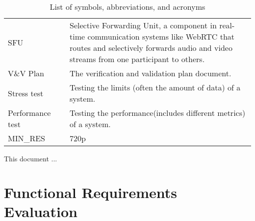 \documentclass[12pt, titlepage]{article}
\begin{document}
\begin{table}[H]
\begin{tabular}{L{0.25\linewidth}L{0.8\linewidth}}
    SFU                        & Selective Forwarding Unit, a component in real-time communication systems like WebRTC that routes and selectively forwards audio and video streams from one participant to others. \\
    V\&V Plan                  & The verification and validation plan document.                                                                                                                                     \\
    Stress test                & Testing the limits (often the amount of data) of a system.                                                                                                                         \\
    Performance test           & Testing the performance(includes different metrics) of a system.                                                                                                                   \\
    MIN\_RES \label{const:res} & 720p                                                                                                                                                                               \\ \bottomrule
  \end{tabular}
  \caption{List of symbols, abbreviations, and acronyms}
  \label{tab:abbrv}
\end{table}

\newpage

\tableofcontents

\listoftables %

\listoffigures %

\newpage


This document ...

\section{Functional Requirements Evaluation}
\end{document}
